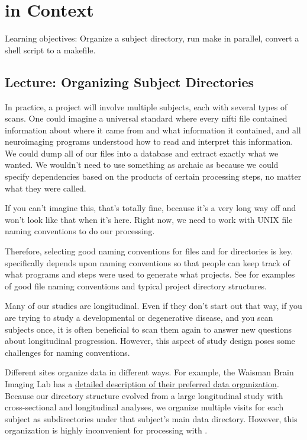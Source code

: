 \chapter{\maken{} in Context}
\label{practicum2}

Learning objectives: Organize a subject directory, run make in parallel, convert a shell script to a makefile.
\section{Lecture: Organizing Subject Directories}

In practice, a project will involve multiple subjects, each with
several types of scans. One could imagine a universal standard where
every nifti file contained information about where it came from and
what information it contained, and all neuroimaging programs
understood how to read and interpret this information. We could dump
all of our files into a database and extract exactly what we
wanted. We wouldn't need to use something as archaic as \maken{} because
we could specify dependencies based on the products of certain
processing steps, no matter what they were called.

If you can't imagine this, that's totally fine, because it's a very
long way off and won't look like that when it's here. Right now, we
need to work with UNIX file naming conventions to do our processing.

Therefore, selecting good naming conventions for files and for
directories is key. \maken{} specifically depends upon naming
conventions so that people can keep track of what programs and steps
were used to generate what projects. See  for examples of good file naming conventions and typical project directory structures. 


Many of our studies are longitudinal. Even if they don't start out
that way, if you are trying to study a developmental or degenerative
disease, and you scan subjects once, it is often beneficial to scan
them again to answer new questions about longitudinal
progression. However, this aspect of study design poses some
challenges for naming conventions. 

Different sites organize data in different ways. For example, the
Waisman Brain Imaging Lab has a \href{http://brainimaging.waisman.wisc.edu/~oakes/teaching/directory_structure.html}{detailed description of their
preferred data organization}. 
Because our directory structure evolved from a large longitudinal
study with cross-sectional and longitudinal analyses, we
organize multiple visits for each subject as subdirectories under that
subject's main data directory. However, this organization is highly
inconvenient for processing with \maken{}.  

